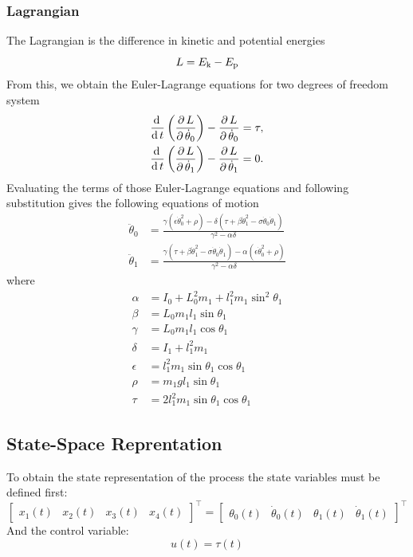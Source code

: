 \subsubsection{Lagrangian}
The Lagrangian is the difference in kinetic and potential energies
\begin{equation}
	L = E _{\text{k}} - E _{\text{p}}
\end{equation}
From this, we obtain the Euler-Lagrange equations for two degrees of freedom system
\begin{subequations}
	\begin{align}
		\frac{\mathrm{d}\, }{\mathrm{d}\, t}\left( \frac{\partial\, L}{\partial\, \dot{\theta}_0} \right)-\frac{\partial\, L}{\partial\, \dot{\theta}_0} = \tau,\\
		\frac{\mathrm{d}\, }{\mathrm{d}\, t}\left( \frac{\partial\, L}{\partial\, \dot{\theta}_1} \right)-\frac{\partial\, L}{\partial\, \dot{\theta}_1} = 0.
	\end{align}
\end{subequations}
Evaluating the terms of those Euler-Lagrange equations and following substitution gives the following equations of motion
\begin{subequations}
	\begin{align}
	\ddot{\theta}_0 &= \frac{\gamma(\epsilon\dot{\theta}_0^2+\rho)-\delta(\tau+\beta\dot{\theta}_1^2-\sigma\dot{\theta}_0\dot{\theta}_1)}{\gamma^2-\alpha\delta}\label{motion1}\\
	\ddot{\theta}_1 &= \frac{\gamma(\tau+\beta\dot{\theta}_1^2-\sigma\dot{\theta}_0\dot{\theta}_1)-\alpha(\epsilon\dot{\theta}_0^2+\rho)}{\gamma^2-\alpha\delta}\label{motion2}
	\end{align}
\end{subequations}
where
\begin{subequations}
	\begin{align}
	\alpha &= I_0+L_0^2m_1+l_1^2m_1\sin^2\theta_1\\
	\beta &= L_0m_1l_1\sin\theta_1 \\
	\gamma &= L_0m_1l_1\cos\theta_1\\
	\delta &= I_1+l_1^2m_1\\
	\epsilon &= l^2_1m_1\sin\theta_1\cos\theta_1\\
	\rho &= m_1gl_1\sin\theta_1\\
	\tau &= 2l^2_1m_1\sin\theta_1\cos\theta_1
	\end{align}
\end{subequations}
\subsection{State-Space Reprentation} 
To obtain the state representation of the process the state variables must be defined first:
\begin{equation}
\begin{bmatrix}
x_1(t)&x_2(t)&x_3(t)&x_4(t)
\end{bmatrix}^\intercal = 
\begin{bmatrix}
\theta_0(t)&\dot{\theta}_0(t)&\theta_1(t)&\dot{\theta}_1(t)
\end{bmatrix}^\intercal
\end{equation}
And the control variable:
\begin{equation} u(t) = \tau(t) \end{equation}
